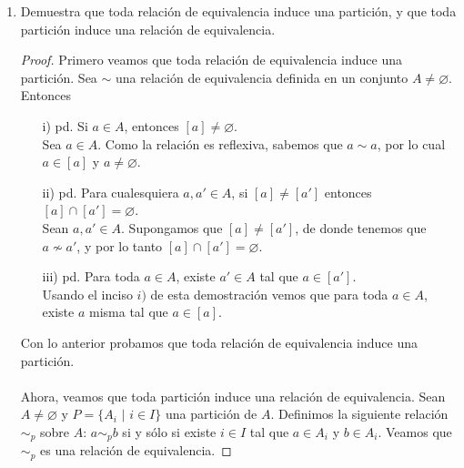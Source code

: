 \documentclass[letterpaper,11pt]{article}
\begin{document}
\begin{enumerate}
\begin{itemize}
        \end{itemize}
        
        \item Demuestra que toda relación de equivalencia induce una partición,
        y que toda partición induce una relación de equivalencia.
        
        \begin{proof}
            Primero veamos que toda relación de equivalencia induce una 
            partición. Sea $\sim$ una relación de equivalencia definida en 
            un conjunto $A \neq \varnothing$. Entonces
           
            \begin{itemize}
                
                \item[i)] pd. Si $a \in A$, entonces $[a] \neq \varnothing$. \\
                Sea $a \in A$. Como la relación es reflexiva, sabemos que
                $a \sim a$, por lo cual $a \in [a]$ y $a \neq \varnothing$.
                
                \item[ii)] pd. Para cualesquiera $a, a' \in A$, si 
                $[a] \neq [a']$ entonces $[a] \cap [a'] = \varnothing$. \\
                Sean $a, a' \in A$. Supongamos que $[a] \neq [a']$, de donde
                tenemos que $a \nsim a'$, y por lo tanto 
                $[a] \cap [a'] = \varnothing$.
                
                \item[iii)] pd. Para toda $a \in A$, existe $a' \in A$ tal que 
                $a \in [a']$. \\
                Usando el inciso $i)$ de esta demostración vemos que para toda
                $a \in A$, existe $a$ misma tal que $a \in [a]$.
                
            \end{itemize}
            
            Con lo anterior probamos que toda relación de equivalencia induce
            una partición. \\ \\
            Ahora, veamos que toda partición induce una relación de
            equivalencia. Sean $A \neq \varnothing$ y $P = \{A_{i}$ $|$ 
            $i \in I \}$ una partición de $A$. Definimos la siguiente 
            relación $\sim_{p}$ sobre $A$: $a \sim_{p} b$ si y sólo si existe
            $i \in I$ tal que $a \in A_{i}$ y $b \in A_{i}$. Veamos que 
            $\sim_{p}$ es una relación de equivalencia.
            

\end{proof}
\end{enumerate}
\end{document}
